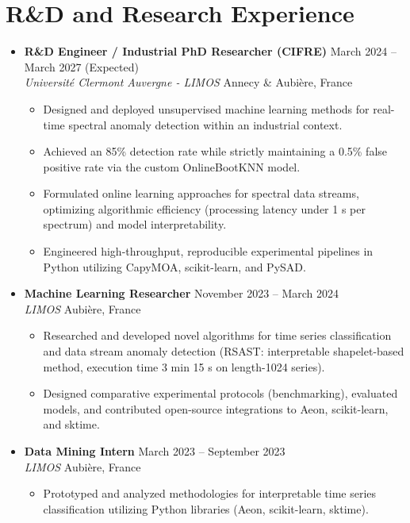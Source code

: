 \documentclass[12pt,a4paper]{article}
\begin{document}
\section*{R\&D and Research Experience}
\begin{itemize}
\item \textbf{R\&D Engineer / Industrial PhD Researcher (CIFRE)} \hfill March 2024 -- March 2027 (Expected)\\
\textit{Université Clermont Auvergne - LIMOS} \hfill Annecy \& Aubière, France
\begin{itemize}
\item Designed and deployed unsupervised machine learning methods for real-time spectral anomaly detection within an industrial context.
\item Achieved an 85\% detection rate while strictly maintaining a 0.5\% false positive rate via the custom OnlineBootKNN model.
\item Formulated online learning approaches for spectral data streams, optimizing algorithmic efficiency (processing latency under 1 s per spectrum) and model interpretability.
\item Engineered high-throughput, reproducible experimental pipelines in Python utilizing CapyMOA, scikit-learn, and PySAD.
\end{itemize}

\item \textbf{Machine Learning Researcher} \hfill November 2023 -- March 2024\\
\textit{LIMOS} \hfill Aubière, France
\begin{itemize}
\item Researched and developed novel algorithms for time series classification and data stream anomaly detection (RSAST: interpretable shapelet-based method, execution time 3 min 15 s on length-1024 series).
\item Designed comparative experimental protocols (benchmarking), evaluated models, and contributed open-source integrations to Aeon, scikit-learn, and sktime.
\end{itemize}

\item \textbf{Data Mining Intern} \hfill March 2023 -- September 2023\\
\textit{LIMOS} \hfill Aubière, France
\begin{itemize}
\item Prototyped and analyzed methodologies for interpretable time series classification utilizing Python libraries (Aeon, scikit-learn, sktime).
\end{itemize}
\end{itemize}
\end{document}
